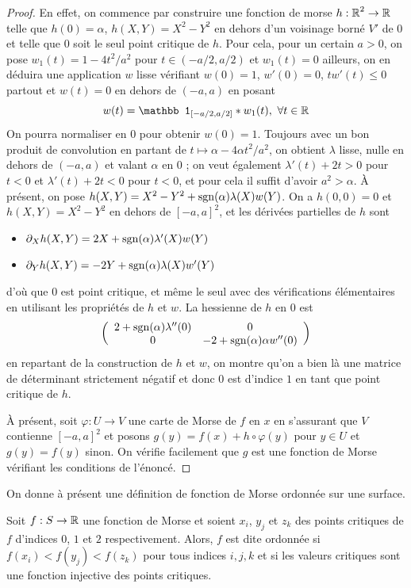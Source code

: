\begin{proof}
    En effet, on commence par construire une fonction de morse $h:\operatorname{\mathbb R}^2\to\operatorname{\mathbb R}$ telle que 
    $h(0)=\alpha$, $h(X,Y)=X^2-Y^2$ en dehors d'un voisinage borné $V'$ de $0$ et telle que 
    $0$ soit le seul point critique de $h$.
    Pour cela, pour un certain $a>0$, on pose $w_1(t)=1-4t^2/a^2$ pour $t\in(-a/2,a/2)$ 
    et $w_1(t)=0$ ailleurs, on en déduira une application $w$ lisse vérifiant $w(0)=1$, 
    $w'(0)=0$, $tw'(t)\leq 0$ partout et $w(t)=0$ en dehors de $(-a,a)$ en posant 
    \[
        w(t)=\mathbb1_{[-a/2,a/2]}*w_1(t),\ \forall t\in\R
    \]
    On pourra normaliser en $0$ pour obtenir $w(0)=1$.
    Toujours avec un bon produit de convolution en partant de $t\mapsto\alpha-4\alpha t^2/a^2$, 
    on obtient $\lambda$ lisse, nulle en dehors de $(-a,a)$ et valant $\alpha$ en $0$ ; 
    on veut également $\lambda'(t)+2t>0$ pour $t<0$ et $\lambda'(t)+2t<0$ pour $t<0$, et pour 
    cela il suffit d'avoir $a^2> \alpha$.      
    À présent, on pose $h(X,Y)=X^2-Y^2+\operatorname{sgn}(\alpha)\lambda(X)w(Y)$.
    On a $h(0,0)=0$ et $h(X,Y)=X^2-Y^2$ en dehors de $[-a,a]^2$, et les dérivées partielles de 
    $h$ sont 
    \begin{itemize}
        \item[] $\partial_Xh(X,Y)=2X+\operatorname{sgn}(\alpha)\lambda'(X)w(Y)$
        \item[] $\partial_Yh(X,Y)=-2Y+\operatorname{sgn}(\alpha)\lambda(X)w'(Y)$
    \end{itemize}
    d'où que $0$ est point critique, et même le seul avec des vérifications élémentaires en 
    utilisant les propriétés de $h$ et $w$.
    La hessienne de $h$ en $0$ est
    \[
        \left(\begin{array}{c c}2+\operatorname{sgn}(\alpha)\lambda''(0) & 0\\ 0 & -2+\operatorname{sgn}(\alpha)\alpha w''(0)\end{array}\right)
    \] 
    en repartant de la construction de $h$ et $w$, on montre qu'on a bien là une matrice de 
    déterminant strictement négatif et donc $0$ est d'indice $1$ en tant que point critique de $h$.

    À présent, soit $\varphi:U\to V$ une carte de Morse de $f$ en $x$ en s'assurant que $V$ 
    contienne $[-a,a]^2$ et posons $g(y)=f(x)+h\circ\varphi(y)$ pour $y\in U$ et $g(y)=f(y)$ sinon.
    On vérifie facilement que $g$ est une fonction de Morse vérifiant les conditions de l'énoncé.
\end{proof}

On donne à présent une définition de fonction de Morse ordonnée sur une surface.
\begin{defi}
    Soit $f:S\to\operatorname{\mathbb R}$ une fonction de Morse et soient $x_i$, $y_j$ et $z_k$ des points critiques 
    de $f$ d'indices $0$, $1$ et $2$ respectivement.
    Alors, $f$ est dite ordonnée si $f(x_i)<f(y_j)<f(z_k)$ pour tous indices $i,j,k$ et si les 
    valeurs critiques sont une fonction injective des points critiques.    
\end{defi}


